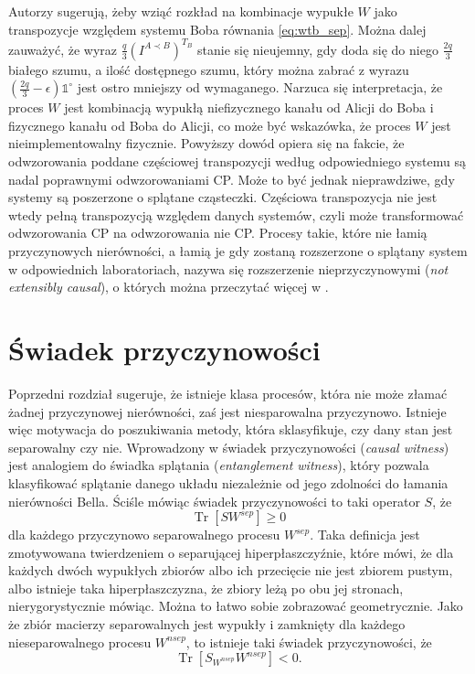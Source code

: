 \documentclass[10pt]{article} %
\DeclareMathOperator{\Trs}{Tr}
\newcommand{\IO}{\mathbb{1}^\circ}
\begin{document}
Autorzy \cite{causal_model} sugerują, żeby wziąć rozkład na kombinacje wypukłe $W$ jako transpozycje względem systemu Boba równania \eqref{eq:wtb_sep}. Można dalej zauważyć, że wyraz $\frac{q}{3} \left( I^{A \prec B} \right)^{T_B}$ stanie się nieujemny, gdy doda się do niego $\frac{2q}{3}$ białego szumu,
a ilość dostępnego szumu, który można zabrać z wyrazu $\left( \frac{2q}{3} - \epsilon \right) \IO$ jest ostro mniejszy od wymaganego. Narzuca się interpretacja, że proces $W$ jest kombinacją wypukłą niefizycznego kanału od Alicji do Boba i fizycznego kanału od Boba do Alicji, co może być wskazówka, że proces
$W$ jest nieimplementowalny fizycznie.
Powyższy dowód opiera się na fakcie, że odwzorowania poddane częściowej transpozycji według odpowiedniego systemu są nadal poprawnymi odwzorowaniami CP.
Może to być jednak nieprawdziwe, gdy systemy są poszerzone o splątane cząsteczki. Częściowa transpozycja nie jest wtedy pełną transpozycją względem danych systemów, czyli może transformować odwzorowania CP na odwzorowania nie CP. Procesy takie, które nie łamią przyczynowych nierówności, a łamią je gdy zostaną rozszerzone o splątany system w odpowiednich laboratoriach, nazywa się rozszerzenie nieprzyczynowymi (\textit{not extensibly causal}),
o których można przeczytać więcej w \cite{causal_model}.
\section{Świadek przyczynowości} 
Poprzedni rozdział sugeruje, że istnieje klasa procesów, która nie może złamać żadnej przyczynowej nierówności, zaś jest niesparowalna przyczynowo. Istnieje więc motywacja do poszukiwania metody, która sklasyfikuje, czy dany stan jest separowalny czy nie. Wprowadzony w \cite{causal_witness}
świadek przyczynowości (\textit{causal witness}) jest analogiem do świadka splątania (\textit{entanglement witness}), który pozwala klasyfikować splątanie danego układu niezależnie od jego zdolności do łamania nierówności Bella. Ściśle mówiąc świadek przyczynowości to taki operator $S$, że
\begin{equation}
\label{eq:witness_gez}
\Trs\left[S W^{sep} \right]\geq 0
\end{equation}
dla każdego przyczynowo separowalnego procesu $W^{sep}$. Taka definicja jest zmotywowana twierdzeniem o separującej hiperpłaszczyźnie, które mówi, że dla każdych dwóch wypukłych zbiorów albo ich przecięcie nie jest zbiorem pustym, albo istnieje taka hiperpłaszczyzna, że zbiory leżą po obu jej stronach, nierygorystycznie mówiąc. Można to łatwo sobie zobrazować geometrycznie. Jako że zbiór macierzy separowalnych jest wypukły i zamknięty dla każdego nieseparowalnego procesu $W^{nsep}$, to istnieje taki świadek przyczynowości, że 
\begin{equation}
\Trs \left[ S_{W^{nsep}} W^{nsep} \right] < 0.
\end{equation}
\end{document}
